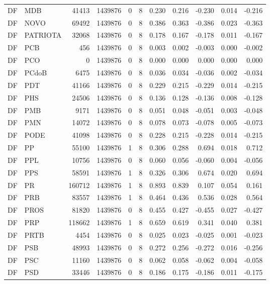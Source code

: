 \begin{landscape}
\begin{longtable}{llrrrrrrrrr}
DF & MDB & 41413 & 1439876 & 0 & 8 & 0.230 & 0.216 & -0.230 & 0.014 & -0.216 \\
DF & NOVO & 69492 & 1439876 & 0 & 8 & 0.386 & 0.363 & -0.386 & 0.023 & -0.363 \\
DF & PATRIOTA & 32068 & 1439876 & 0 & 8 & 0.178 & 0.167 & -0.178 & 0.011 & -0.167 \\
DF & PCB & 456 & 1439876 & 0 & 8 & 0.003 & 0.002 & -0.003 & 0.000 & -0.002 \\
DF & PCO & 0 & 1439876 & 0 & 8 & 0.000 & 0.000 & 0.000 & 0.000 & 0.000 \\
DF & PCdoB & 6475 & 1439876 & 0 & 8 & 0.036 & 0.034 & -0.036 & 0.002 & -0.034 \\
DF & PDT & 41166 & 1439876 & 0 & 8 & 0.229 & 0.215 & -0.229 & 0.014 & -0.215 \\
DF & PHS & 24506 & 1439876 & 0 & 8 & 0.136 & 0.128 & -0.136 & 0.008 & -0.128 \\
DF & PMB & 9171 & 1439876 & 0 & 8 & 0.051 & 0.048 & -0.051 & 0.003 & -0.048 \\
DF & PMN & 14072 & 1439876 & 0 & 8 & 0.078 & 0.073 & -0.078 & 0.005 & -0.073 \\
DF & PODE & 41098 & 1439876 & 0 & 8 & 0.228 & 0.215 & -0.228 & 0.014 & -0.215 \\
DF & PP & 55100 & 1439876 & 1 & 8 & 0.306 & 0.288 & 0.694 & 0.018 & 0.712 \\
DF & PPL & 10756 & 1439876 & 0 & 8 & 0.060 & 0.056 & -0.060 & 0.004 & -0.056 \\
DF & PPS & 58591 & 1439876 & 1 & 8 & 0.326 & 0.306 & 0.674 & 0.020 & 0.694 \\
DF & PR & 160712 & 1439876 & 1 & 8 & 0.893 & 0.839 & 0.107 & 0.054 & 0.161 \\
DF & PRB & 83557 & 1439876 & 1 & 8 & 0.464 & 0.436 & 0.536 & 0.028 & 0.564 \\
DF & PROS & 81820 & 1439876 & 0 & 8 & 0.455 & 0.427 & -0.455 & 0.027 & -0.427 \\
DF & PRP & 118662 & 1439876 & 1 & 8 & 0.659 & 0.619 & 0.341 & 0.040 & 0.381 \\
DF & PRTB & 4454 & 1439876 & 0 & 8 & 0.025 & 0.023 & -0.025 & 0.001 & -0.023 \\
DF & PSB & 48993 & 1439876 & 0 & 8 & 0.272 & 0.256 & -0.272 & 0.016 & -0.256 \\
DF & PSC & 11160 & 1439876 & 0 & 8 & 0.062 & 0.058 & -0.062 & 0.004 & -0.058 \\
DF & PSD & 33446 & 1439876 & 0 & 8 & 0.186 & 0.175 & -0.186 & 0.011 & -0.175 \\

\end{longtable}
\end{landscape}
